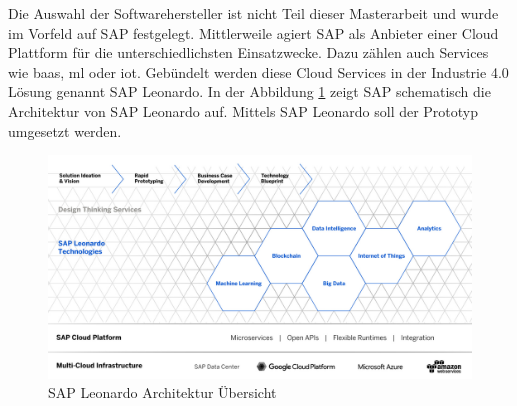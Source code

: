 Die Auswahl der Softwarehersteller ist nicht Teil dieser Masterarbeit und wurde im Vorfeld auf SAP festgelegt. Mittlerweile agiert SAP als Anbieter einer Cloud Plattform für die unterschiedlichsten Einsatzwecke. \cite{SAP2018} Dazu zählen auch Services wie \ac{baas}, \ac{ml} oder \ac{iot}. Gebündelt werden diese Cloud Services in der Industrie 4.0 Lösung genannt SAP Leonardo. In der Abbildung \ref{fig:sap-leonardo-innovation-system} zeigt SAP schematisch die Architektur von SAP Leonardo auf. Mittels SAP Leonardo soll der Prototyp umgesetzt werden.

\begin{figure}[h!]
	\centering
	\includegraphics[width=0.9\linewidth]{pictures/sap-leonardo-innovation-system}
	\caption[SAP Leonardo Architektur Übersicht]{SAP Leonardo Architektur Übersicht \cite{Leonardo}}
	\label{fig:sap-leonardo-innovation-system}
\end{figure}

%
%

\newpage